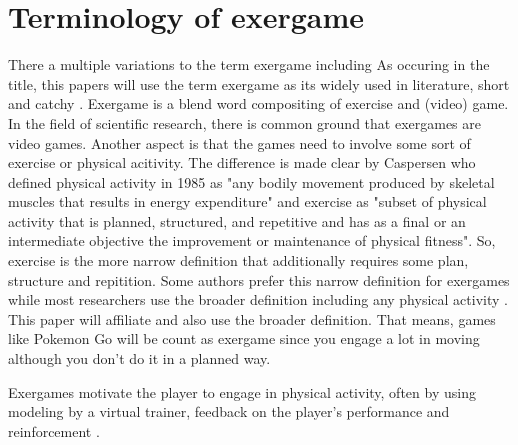 \section{Terminology of exergame}
There a multiple variations to the term exergame including 
As occuring in the title, this papers will use the term exergame as its widely used in literature, short and catchy \cite{oh2010defining}. Exergame is a blend word compositing of exercise and (video) game. In the field of scientific research, there is common ground that exergames are video games. Another aspect is that the games need to involve some sort of exercise or physical acitivity. The difference is made clear by Caspersen who defined \cite{caspersen1985physical} physical activity in 1985 as "any bodily movement produced by skeletal muscles that results in energy expenditure" and exercise as "subset of physical activity that is planned, structured, and repetitive and has as a final or an intermediate objective the improvement or maintenance of physical fitness". So, exercise is the more narrow definition that additionally requires some plan, structure and repitition. Some authors prefer this narrow definition for exergames while most researchers use the broader definition including any physical activity \cite{oh2010defining}. This paper will affiliate and also use the broader definition. That means, games like Pokemon Go will be count as exergame since you engage a lot in moving although you don't do it in a planned way.

Exergames motivate the player to engage in physical activity, often by using modeling by a virtual trainer, feedback on the player's performance and reinforcement \cite{lyons13strategies}.
























